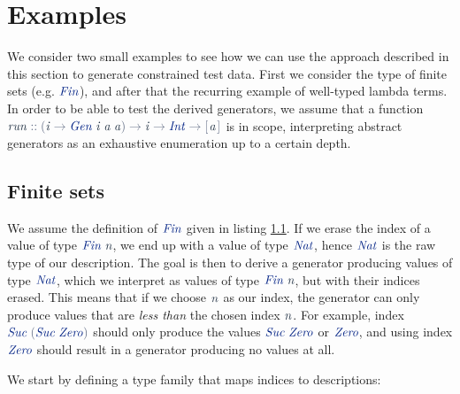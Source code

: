 \documentclass[a4paper,msc,twosized=semi]{uustthesis}
\newcommand*{\mathcolor}{}
\def\mathcolor#1#{\mathcoloraux{#1}}
\newcommand*{\mathcoloraux}[3]{%
  \protect\leavevmode
  \begingroup
    \color#1{#2}#3%
  \endgroup
}
\newcommand{\HSSpecial}[1]{\mathcolor{hsblue4}{#1}}
\newcommand{\HSSym}[1]{\mathcolor{hsblue4}{#1}}
\newcommand{\HSCon}[1]{\mathcolor{hsblue3}{\mathit{#1}}}
\newcommand{\HSVar}[1]{\mathcolor{hsblue5}{\mathit{#1}}}
\begin{document}
\section{Examples}

  We consider two small examples to see how we can use the approach described in this section to generate constrained test data. First we consider the type of finite sets (e.g. \ensuremath{\HSCon{Fin}}), and after that the recurring example of well-typed lambda terms. In order to be able to test the derived generators, we assume that a function \ensuremath{\HSVar{run}\HSSym{::}\HSSpecial{(}\HSVar{i}\HSSym{\to} \HSCon{Gen}\;\HSVar{i}\;\HSVar{a}\;\HSVar{a}\HSSpecial{)}\HSSym{\to} \HSVar{i}\HSSym{\to} \HSCon{Int}\HSSym{\to} \HSSpecial{\HSSym{[\mskip1.5mu} }\HSVar{a}\HSSpecial{\HSSym{\mskip1.5mu]}}} is in scope, interpreting abstract generators as an exhaustive enumeration up to a certain depth. 

\subsection{Finite sets}

  We assume the definition of \ensuremath{\HSCon{Fin}} given in listing \ref{}. If we erase the index of a value of type \ensuremath{\HSCon{Fin}\;\HSVar{n}}, we end up with a value of type \ensuremath{\HSCon{Nat}}, hence \ensuremath{\HSCon{Nat}} is the raw type of our description. The goal is then to derive a generator producing values of type \ensuremath{\HSCon{Nat}}, which we interpret as values of type \ensuremath{\HSCon{Fin}\;\HSVar{n}}, but with their indices erased. This means that if we choose \ensuremath{\HSVar{n}} as our index, the generator can only produce values that are \emph{less than} the chosen index \ensuremath{\HSVar{n}}. For example, index \ensuremath{\HSCon{Suc}\;\HSSpecial{(}\HSCon{Suc}\;\HSCon{Zero}\HSSpecial{)}} should only produce the values \ensuremath{\HSCon{Suc}\;\HSCon{Zero}} or \ensuremath{\HSCon{Zero}}, and using index \ensuremath{\HSCon{Zero}} should result in a generator producing no values at all. 

  We start by defining a type family that maps indices to descriptions: 
\end{document}

